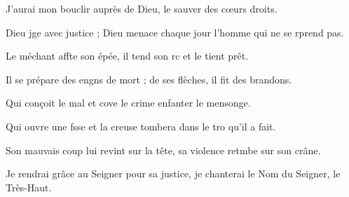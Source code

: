 \item J’aurai mon bouclir auprès de Dieu,\psstar{} le sauver des cœurs droits.
\item Dieu jge avec justice ;\psstar{} Dieu menace chaque jour l’homme qui ne se rprend pas.
\item Le méchant affte son épée,\psstar{} il tend son rc et le tient prêt.
\item Il se prépare des engns de mort ;\psstar{} de ses flèches, il fit des brandons.
\item Qui conçoit le mal et cove le crime\psstar{} enfanter le mensonge.
\item Qui ouvre une fsse et la creuse\psstar{} tombera dans le tro qu’il a fait.
\item Son mauvais coup lui revint sur la tête,\psstar{} sa violence retmbe sur son crâne.
\item Je rendrai grâce au Seigner pour sa justice,\psstar{} je chanterai le Nom du Seigner, le Très-Haut.